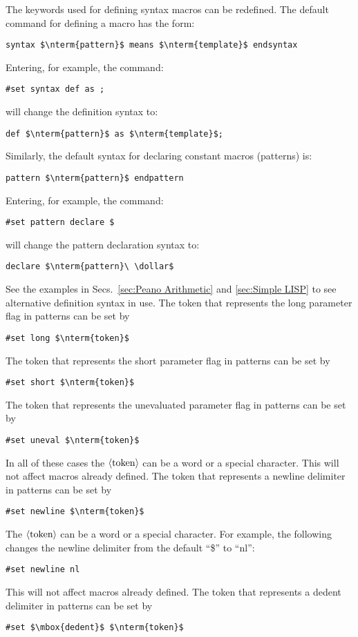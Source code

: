 \documentclass[12pt]{article}
\begin{document}
The keywords used for defining syntax macros can be redefined. The default command for defining a macro has the form:
\begin{lstlisting}[frame=single,mathescape]
syntax $\nterm{pattern}$ means $\nterm{template}$ endsyntax
\end{lstlisting}
Entering, for example, the command:
\begin{lstlisting}[frame=single]
#set syntax def as ;
\end{lstlisting}
will change the definition syntax to:
\begin{lstlisting}[frame=single,mathescape]
def $\nterm{pattern}$ as $\nterm{template}$;
\end{lstlisting}
Similarly, the default syntax for declaring constant macros (patterns) is:
\begin{lstlisting}[frame=single,mathescape]
pattern $\nterm{pattern}$ endpattern
\end{lstlisting}
Entering, for example, the command:
\begin{lstlisting}[frame=single]
#set pattern declare $
\end{lstlisting}
will change the pattern declaration syntax to:
\def\dollar{\mbox{\$}}
\begin{lstlisting}[frame=single,mathescape]
declare $\nterm{pattern}\ \dollar$
\end{lstlisting}
See the examples in Secs.\ \ref{sec:Peano Arithmetic} and \ref{sec:Simple LISP} to see alternative definition syntax in use.
The token that represents the long parameter flag in patterns can be set by
\begin{lstlisting}[frame=single,mathescape]
#set long $\nterm{token}$
\end{lstlisting}
The token that represents the short parameter flag in patterns can be set by
\begin{lstlisting}[frame=single,mathescape]
#set short $\nterm{token}$
\end{lstlisting}
The token that represents the unevaluated parameter flag in patterns can be set by
\begin{lstlisting}[frame=single,mathescape]
#set uneval $\nterm{token}$
\end{lstlisting}
In all of these cases the $\langle\mbox{token}\rangle$ can be a word or a special character.
This will not affect macros already defined.
The token that represents a newline delimiter in patterns can be set by
\begin{lstlisting}[frame=single,mathescape]
#set newline $\nterm{token}$
\end{lstlisting}
The $\langle\mbox{token}\rangle$ can be a word or a special character.
For example, the following changes the newline delimiter from the default ``\$'' to ``nl'':
\begin{lstlisting}[frame=single]
#set newline nl
\end{lstlisting}
This will not affect macros already defined.
The token that represents a dedent delimiter in patterns can be set by
\begin{lstlisting}[frame=single,mathescape]
#set $\mbox{dedent}$ $\nterm{token}$
\end{lstlisting}
\end{document}
